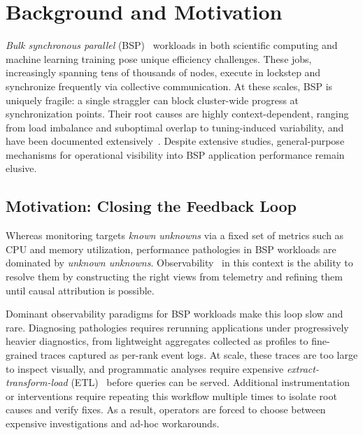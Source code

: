 
\section{Background and Motivation}

\emph{Bulk synchronous parallel} (BSP)~\cite{Valia1990:BSP} workloads in both scientific computing and machine learning
training pose unique efficiency challenges.
These jobs, increasingly spanning tens of thousands of nodes, execute in lockstep and synchronize
frequently via collective communication.
At these scales, BSP is uniquely fragile: a single straggler can block cluster-wide progress at
synchronization points.
Their root causes are highly context-dependent, ranging from load imbalance and suboptimal overlap
to tuning-induced variability, and have been documented
extensively~\cite{Petri2003:Missing,VanS2009:AMR,Kocol2018:Varbench,Gunaw2018:FailSlow,Acun2016:Mitigating,Acun2016:Variation,Lu2023:PERSEUS,Yildi2016:IONoise,You2024:GVARP,Xuan2025:STAD,Gangi2024:RDMA,Jain2025:AMR}.
Despite extensive studies, general-purpose mechanisms for operational visibility into BSP
application performance remain elusive.


\subsection{Motivation: Closing the Feedback Loop}

Whereas monitoring targets \emph{known unknowns} via a fixed set of metrics such as CPU and memory
utilization, performance pathologies in BSP workloads are dominated by \emph{unknown unknowns}.
Observability~\cite{Major2017:o11y,Major2020:o11y,:OtelO11y,Sridh:DistributedSystemsObservability}
in this context is the ability to resolve them by constructing the right views from telemetry and
refining them until causal attribution is possible.

Dominant observability paradigms for BSP workloads make this loop slow and rare.
Diagnosing pathologies requires rerunning applications under progressively heavier diagnostics,
from lightweight aggregates collected as profiles to fine-grained traces captured as per-rank event
logs.
At scale, these traces are too large to inspect visually, and programmatic analyses require
expensive \emph{extract-transform-load} (ETL)~\cite{Yildi2023:IOMax} before queries can be served.
Additional instrumentation or interventions require repeating this workflow multiple times to
isolate root causes and verify fixes.
As a result, operators are forced to choose between expensive investigations and ad-hoc
workarounds.

